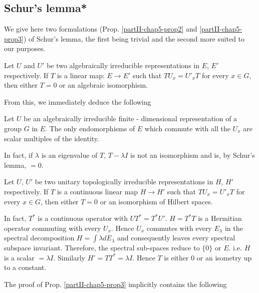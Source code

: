 \subsection{Schur's lemma*}\label{partII-chap5-sec5.4}%
   
We give here two formulations (Prop. \ref{partII-chap5-prop2}
and \ref{partII-chap5-prop3}) of Schur's lemma, the
first being trivial and  the second more suited to our purposes. 
 
 \begin{proposition}\label{partII-chap5-prop2}%
 Let $U$ and $U'$ be two algebraically irreducible representations in
 $E$, $E'$ respectively. If $T$ is a linear map: $E \rightarrow  E'$
 such that $T U_{x}= U'_{x}T$\pageoriginale 
 for every $x \in  G$, then either $T=0$
 or an algebraic isomorphism. 
\end{proposition}  
      
From this, we immediately deduce the following

\begin{coro*} %
Let $U$ be an algebraically irreducible finite - dimensional
representation of  a group  $G$ in $E$. The only endomorphisms  of $E$
which commute with  all the $U_{x}$  are scalar multiples of the
identity. 
\end{coro*}
 
In fact, if $\lambda$ is  an eigenvalue  of $T$, $T-\lambda I$  is not
an isomorphism and is, by Schur's lemma, $=0$. 
 
\begin{proposition}\label{partII-chap5-prop3}%
Let $U$, $U'$ be two  unitary topologically irreducible representations in
$H$, $H'$ respectively. If $T$ is a continuous linear map $H
\rightarrow H'$ such that $TU_{x} = U'_{x}T$ for every $x \in G$,
then either $T=0$ or an isomorphism of Hilbert spaces. 
\end{proposition}

In fact, $T^*$ is a continuous  operator  with $UT^*=T^*U'$. $H=T^*T$  is a
Hermitian  operator commuting with every $U_{x}$. Hence $U_{x}$
commutes with every $E_{\lambda}$ in the spectral decomposition  $H=
\int \lambda dE_{\lambda}$ and consequently leaves every spectral  
 subspace invariant. Therefore, the spectral sub-spaces reduce to
 $\{0\}$ or $E$. i.e.  $H$ is a scalar $=\lambda I$.  Similarly $H' =
 TT^*= \lambda I$.  Hence $T$ is either $0$ or an isometry  up to
 a constant. 
 
The proof  of Prop. \ref{partII-chap5-prop3} implicitly contains the
following 
 
